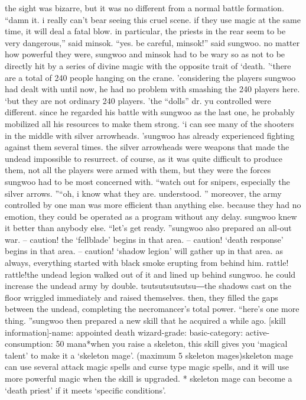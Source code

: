 the sight was bizarre, but it was no different from a normal battle formation.
“damn it.
 i really can’t bear seeing this cruel scene.
 if they use magic at the same time, it will deal a fatal blow.
 in particular, the priests in the rear seem to be very dangerous,” said minsok.
“yes.
 be careful, minsok!” said sungwoo.
no matter how powerful they were, sungwoo and minsok had to be wary so as not to be directly hit by a series of divine magic with the opposite trait of ‘death.
’‘there are a total of 240 people hanging on the crane.
’considering the players sungwoo had dealt with until now, he had no problem with smashing the 240 players here.
‘but they are not ordinary 240 players.
’the “dolls” dr.
 yu controlled were different.
 since he regarded his battle with sungwoo as the last one, he probably mobilized all his resources to make them strong.
‘i can see many of the shooters in the middle with silver arrowheads.
’sungwoo has already experienced fighting against them several times.
 the silver arrowheads were weapons that made the undead impossible to resurrect.
of course, as it was quite difficult to produce them, not all the players were armed with them, but they were the forces sungwoo had to be most concerned with.
“watch out for snipers, especially the silver arrows.
”“oh, i know what they are.
 understood.
”
moreover, the army controlled by one man was more efficient than anything else.
because they had no emotion, they could be operated as a program without any delay.
sungwoo knew it better than anybody else.
“let’s get ready.
”sungwoo also prepared an all-out war.
– caution! the ‘fellblade’ begins in that area.
– caution! ‘death response’ begins in that area.
– caution! ‘shadow legion’ will gather up in that area.
as always, everything started with black smoke erupting from behind him.
rattle! rattle!the undead legion walked out of it and lined up behind sungwoo.
 he could increase the undead army by double.
tsutsutsutsutsu―the shadows cast on the floor wriggled immediately and raised themselves.
 then, they filled the gaps between the undead, completing the necromancer’s total power.
“here’s one more thing.
”sungwoo then prepared a new skill that he acquired a while ago.
[skill information]-name: appointed death wizard-grade: basic-category: active-consumption: 50 mana*when you raise a skeleton, this skill gives you ‘magical talent’ to make it a ‘skeleton mage’.
 (maximum 5 skeleton mages)skeleton mage can use several attack magic spells and curse type magic spells, and it will use more powerful magic when the skill is upgraded.
* skeleton mage can become a ‘death priest’ if it meets ‘specific conditions’.
